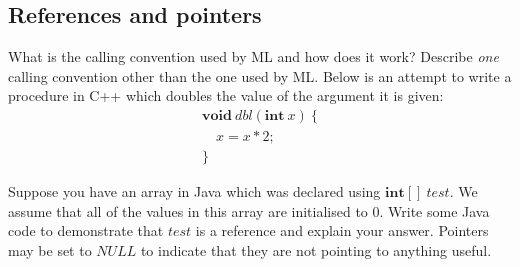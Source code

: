 \documentclass[10pt,a4paper]{exam}
\begin{document}
\begin{questions}
\section*{References and pointers}

\question[2] What is the calling convention used by ML and how does it work? \droppoints 
\question[2] Describe \emph{one} calling convention other than the one used by ML. \droppoints 
\question Below is an attempt to write a procedure in C++ which doubles the value of the argument it is given:
\begin{displaymath}
\begin{array}{l}
\mathbf{void}~\mathit{dbl}(\mathbf{int}~x)~\{ \\
\quad x = x*2;\\
\}
\end{array}
\end{displaymath}
\question[4] Suppose you have an array in Java which was declared using $\mathbf{int}[]~\mathit{test}$. We assume that all of the values in this array are initialised to 0. Write some Java code to demonstrate that $\mathit{test}$ is a reference and explain your answer. \droppoints 
\question Pointers may be set to $\mathit{NULL}$ to indicate that they are not pointing to anything useful.
\begin{parts}

\end{parts}
\end{questions}
\end{document}
